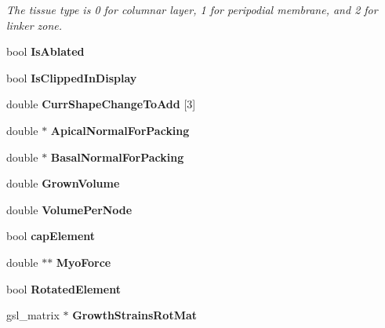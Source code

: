 \begin{DoxyCompactItemize}
\begin{DoxyCompactList}\small\item\em The tissue type is 0 for columnar layer, 1 for peripodial membrane, and 2 for linker zone. \end{DoxyCompactList}\item 
\hypertarget{classShapeBase_a4f09d39d079bfe95ea7c25f5d3de6c09}{}bool {\bfseries Is\+Ablated}\label{classShapeBase_a4f09d39d079bfe95ea7c25f5d3de6c09}

\item 
\hypertarget{classShapeBase_a6f5e25bc9b4376c0aa28aec59af6cf2f}{}bool {\bfseries Is\+Clipped\+In\+Display}\label{classShapeBase_a6f5e25bc9b4376c0aa28aec59af6cf2f}

\item 
\hypertarget{classShapeBase_a3d48903871978d77a77cb77f569975c0}{}double {\bfseries Curr\+Shape\+Change\+To\+Add} \mbox{[}3\mbox{]}\label{classShapeBase_a3d48903871978d77a77cb77f569975c0}

\item 
\hypertarget{classShapeBase_ab84cbf988437cd20fcceee7a24d0c3a8}{}double $\ast$ {\bfseries Apical\+Normal\+For\+Packing}\label{classShapeBase_ab84cbf988437cd20fcceee7a24d0c3a8}

\item 
\hypertarget{classShapeBase_a87f03cc35ac66eeb14487c5f33097891}{}double $\ast$ {\bfseries Basal\+Normal\+For\+Packing}\label{classShapeBase_a87f03cc35ac66eeb14487c5f33097891}

\item 
\hypertarget{classShapeBase_a8a1bafcaf21f040dd137abfe434a75a9}{}double {\bfseries Grown\+Volume}\label{classShapeBase_a8a1bafcaf21f040dd137abfe434a75a9}

\item 
\hypertarget{classShapeBase_a59943ecb9f8ec139c0f564c1fb91d876}{}double {\bfseries Volume\+Per\+Node}\label{classShapeBase_a59943ecb9f8ec139c0f564c1fb91d876}

\item 
\hypertarget{classShapeBase_a21420915ac7c8444e0e5b5f4e98d7322}{}bool {\bfseries cap\+Element}\label{classShapeBase_a21420915ac7c8444e0e5b5f4e98d7322}

\item 
\hypertarget{classShapeBase_a3aedc120b16a922ee9b0c1595630694b}{}double $\ast$$\ast$ {\bfseries Myo\+Force}\label{classShapeBase_a3aedc120b16a922ee9b0c1595630694b}

\item 
\hypertarget{classShapeBase_af64f900d51cec3e48a488fdd8a51eacf}{}bool {\bfseries Rotated\+Element}\label{classShapeBase_af64f900d51cec3e48a488fdd8a51eacf}

\item 
\hypertarget{classShapeBase_acc1408c3e89b91787fec7e913cac1f58}{}gsl\+\_\+matrix $\ast$ {\bfseries Growth\+Strains\+Rot\+Mat}\label{classShapeBase_acc1408c3e89b91787fec7e913cac1f58}

\end{DoxyCompactItemize}
